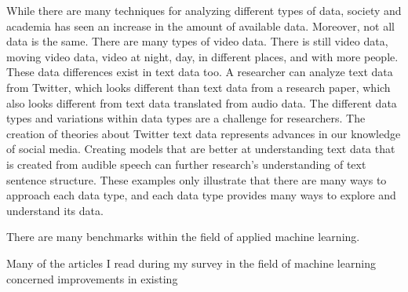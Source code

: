 While there are many techniques for analyzing different types of data, society and academia has seen an increase in the amount of available data.  Moreover, not all data is the same.  There are many types of video data.  There is still video data, moving video data, video at night, day, in different places, and with more people.  These data differences exist in text data too.  A researcher can analyze text data from Twitter, which looks different than text data from a research paper, which also looks different from text data translated from audio data.  The different data types and variations within data types are a challenge for researchers.  The creation of theories about Twitter text data represents advances in our knowledge of social media.  Creating models that are better at understanding text data that is created from audible speech can further research's understanding of text sentence structure.  These examples only illustrate that there are many ways to approach each data type, and each data type provides many ways to explore and understand its data.

There are many benchmarks within the field of applied machine learning.

Many of the articles I read during my survey in the field of machine learning concerned improvements in existing 
